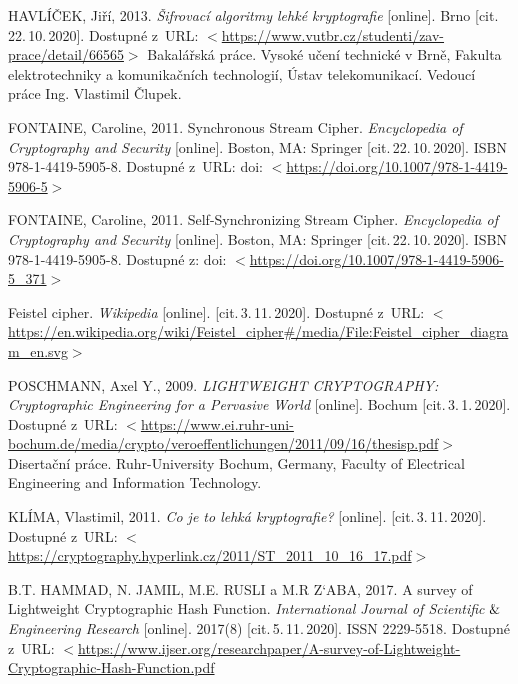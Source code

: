 \begin{thebibliography}{99}
    HAVLÍČEK, Jiří, 
    2013. 
    \emph{Šifrovací algoritmy lehké kryptografie} 
    [online]. 
    Brno 
    [cit.\,22.\,10.\,2020]. 
    Dostupné z~URL: \(<\)\url{https://www.vutbr.cz/studenti/zav-prace/detail/66565}\(>\)
    Bakalářská práce. 
    Vysoké učení technické v Brně, 
    Fakulta elektrotechniky a komunikačních technologií, 
    Ústav telekomunikací. 
    Vedoucí práce Ing. Vlastimil Člupek.
    
    \label{source:synchronous}
    FONTAINE, Caroline, 
    2011. 
    Synchronous Stream Cipher.
    \emph{Encyclopedia of Cryptography and Security} 
    [online]. 
    Boston, MA: Springer 
    [cit.\,22.\,10.\,2020]. 
    ISBN 978-1-4419-5905-8.
    Dostupné z~URL: doi: \(<\)\url{https://doi.org/10.1007/978-1-4419-5906-5}\(>\)
    
    \label{source:asynchronous}
    FONTAINE, Caroline, 
    2011. 
    Self-Synchronizing Stream Cipher. 
    \emph{Encyclopedia of Cryptography and Security} 
    [online]. 
    Boston, MA: Springer 
    [cit.\,22.\,10.\,2020].  
    ISBN 978-1-4419-5905-8. 
    Dostupné z: doi: \(<\)\url{https://doi.org/10.1007/978-1-4419-5906-5_371}\(>\)

    \label{source:FeistelCipher}
    Feistel cipher. 
    \emph{Wikipedia} 
    [online]. 
    [cit.\,3.\,11.\,2020].  
    Dostupné z~URL: \(<\)\url{https://en.wikipedia.org/wiki/Feistel_cipher#/media/File:Feistel_cipher_diagram_en.svg}\(>\)
    
    
    \label{source:poschmannCrypto}
    POSCHMANN, Axel Y., 
    2009. 
    \emph{LIGHTWEIGHT CRYPTOGRAPHY: Cryptographic Engineering for a Pervasive World} 
    [online]. 
    Bochum 
    [cit.\,3.\,1.\,2020]. 
    Dostupné z~URL: \(<\)\url{https://www.ei.ruhr-uni-bochum.de/media/crypto/veroeffentlichungen/2011/09/16/thesisp.pdf}\(>\) 
    Disertační práce. 
    Ruhr-University Bochum, 
    Germany, 
    Faculty of Electrical Engineering and Information Technology.
    
    
    \label{klima}
    KLÍMA, Vlastimil, 
    2011. 
    \emph{Co je to lehká kryptografie?} 
    [online]. 
    [cit.\,3.\,11.\,2020].  
    Dostupné z~URL: \(<\)\url{https://cryptography.hyperlink.cz/2011/ST_2011_10_16_17.pdf}\(>\)

    B.T. HAMMAD, N. JAMIL, M.E. RUSLI a M.R Z`ABA, 
    2017. 
    A survey of Lightweight Cryptographic Hash Function. 
    \emph{International Journal of Scientific\(\And\)Engineering Research} 
    [online]. 
    2017(8) 
    [cit.\,5.\,11.\,2020]. 
    ISSN 2229-5518. 
    Dostupné z~URL: \(<\)\url{https://www.ijser.org/researchpaper/A-survey-of-Lightweight-Cryptographic-Hash-Function.pdf}


\end{thebibliography}
